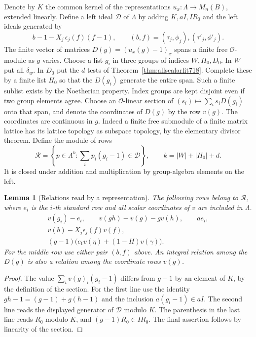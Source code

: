 \documentclass[a4paper,11pt]{article}
\newtheorem{lemma}[proposition]{Lemma}
\theoremstyle{definition}
\theoremstyle{remark}
\numberwithin{equation}{section}
\begin{document}
Denote by \(K\) the common kernel of the representations
\(u_x:\Lambda\to M_n(B)\), extended linearly. Define a left ideal
\(\mathcal D\) of \(\Lambda\) by adding \(K,aI,I R_0\) and the
left ideals generated by
\[
         b-1-X_j\,\epsilon_j(f)(f-1),
      \qquad (b,f)=(\tau_j,\phi_j),(\tau'_j,\phi'_j).
\]
The finite vector of matrices \(D(g)=(u_x(g)-1)_x\) spans a finite
free \(\mathcal O\)-module as \(g\) varies. Choose a list \(g_i\)
in three groups of indices \(W,H_0,D_0\). In \(W\) put all
\(\delta_w\). In \(D_0\) put the \(d\) tests of
Theorem~\ref{thm:allscalarfit718}. Complete these by a finite
list \(H_0\) so that the \(D(g_i)\) generate the entire span.
Such a finite sublist exists by the Noetherian property.
Index groups are kept disjoint even if two group elements agree.
Choose an \(\mathcal O\)-linear section of
\((s_i)\mapsto\sum_i s_iD(g_i)\) onto that span, and denote
the coordinates of \(D(g)\) by the row \(v(g)\).
The coordinates are continuous in \(g\). Indeed a finite free
submodule of a finite matrix lattice has its lattice topology
as subspace topology, by the elementary divisor theorem.
Define the module of rows
\[
       \mathcal R=\left\{p\in\Lambda^{k}:
                   \sum_i p_i(g_i-1)\in\mathcal D\right\},
       \qquad k=|W|+|H_0|+d .
\]
It is closed under addition and multiplication by group-algebra
elements on the left.

\begin{lemma}[Relations read by a representation]
\leavevmode\label{lem:readrows719}
The following rows belong to \(\mathcal R\), where \(e_i\) is
the \(i\)-th standard row and all scalar coordinates of \(v\)
are included in \(\Lambda\).
\[
\begin{gathered}
   v(g_i)-e_i,\qquad v(gh)-v(g)-g v(h),\qquad a e_i,\\
   v(b)-X_j\epsilon_j(f)v(f),\\
   (g-1)\bigl(c_1v(\eta)+(1-H)v(\gamma)\bigr).
\end{gathered}
\]
For the middle row use either pair \((b,f)\) above.
An integral relation among the \(D(g)\) is also a relation
among the coordinate rows \(v(g)\).
\end{lemma}
\begin{proof}
The value \(\sum_i v(g)_i(g_i-1)\) differs from \(g-1\) by an
element of \(K\), by the definition of the section. For the
first line use the identity \(gh-1=(g-1)+g(h-1)\) and the
inclusion \(a(g_i-1)\in aI\). The second line reads the
displayed generator of \(\mathcal D\) modulo \(K\).
The parenthesis in the last line reads \(R_0\) modulo \(K\),
and \((g-1)R_0\in I R_0\). The final assertion follows by
linearity of the section.
\end{proof}
\end{document}
